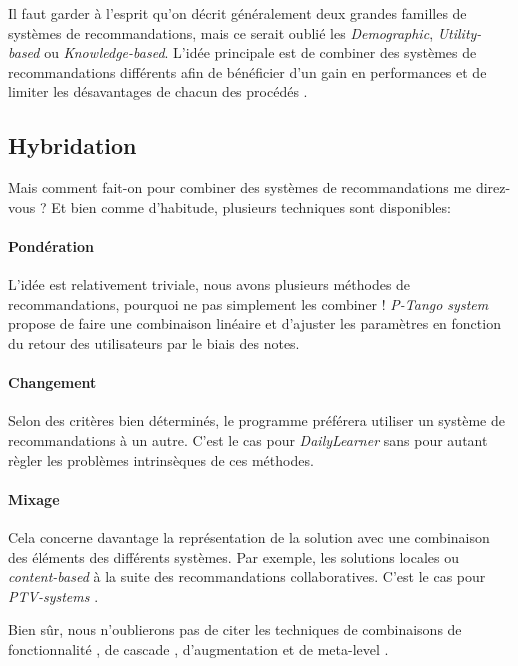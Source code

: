 Il faut garder à l'esprit qu'on décrit généralement deux grandes familles de systèmes de recommandations, mais ce serait oublié les \textit{Demographic}, \textit{Utility-based} ou \textit{Knowledge-based}. L'idée principale est de combiner des systèmes de recommandations différents afin de bénéficier d'un gain en performances et de limiter les désavantages de chacun des procédés \cite{pazzani2007content}.

\subsection{Hybridation}

Mais comment fait-on pour combiner des systèmes de recommandations me direz-vous ? Et bien comme d'habitude, plusieurs techniques sont disponibles:

\paragraph{Pondération}

L'idée est relativement triviale, nous avons plusieurs méthodes de recommandations, pourquoi ne pas simplement les combiner ! \textit{P-Tango system} \cite{claypool1999combining} propose de faire une combinaison linéaire et d'ajuster les paramètres en fonction du retour des utilisateurs par le biais des notes.

\paragraph{Changement}

Selon des critères bien déterminés, le programme préférera utiliser un système de recommandations à un autre. C'est le cas pour \textit{DailyLearner} \cite{billsus2000user} sans pour autant règler les problèmes intrinsèques de ces méthodes.

\paragraph{Mixage}

Cela concerne davantage la représentation de la solution avec une combinaison des éléments des différents systèmes.
Par exemple, les solutions locales ou \textit{content-based} à la suite des recommandations collaboratives.
C'est le cas pour \textit{PTV-systems} \cite{smyth2000personalised}.

Bien sûr, nous n'oublierons pas de citer les techniques de combinaisons de fonctionnalité \cite{basu1998recommendation}, de cascade \cite{burke2002hybrid}, d'augmentation \cite{mooney2000content, konstan1997grouplens} et de meta-level \cite{balabanovic1997fab}.

